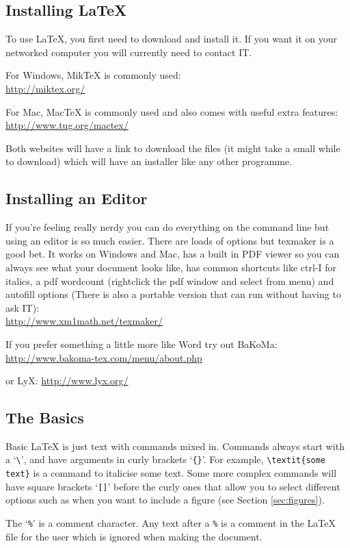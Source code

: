 \documentclass[11pt,a4paper,oneside]{article}
\begin{document}
\subsection{Installing \LaTeX}
To use \LaTeX, you first need to download and install it.  If you want it on your networked computer you will currently need to contact IT. 

For Windows, MikTeX is commonly used:\\
\url{http://miktex.org/}

For Mac,  MacTeX is commonly used and also comes with useful extra features:\\
\url{http://www.tug.org/mactex/}

Both websites will have a link to download the files (it might take a small while to download) which will have an installer like any other programme. 

\subsection{Installing an Editor}
If you're feeling really nerdy you can do everything on the command line but using an editor is so much easier.  There are loads of options but texmaker is a good bet.  It works on Windows and Mac, has a built in PDF viewer so you can always see what your document looks like, has common shortcuts like ctrl-I for italics, a pdf wordcount (rightclick the pdf window and select from menu) and autofill options (There is also a portable version that can run without having to ask IT):\\
\url{http://www.xm1math.net/texmaker/}

If you prefer something a little more like Word try out BaKoMa:
\url{http://www.bakoma-tex.com/menu/about.php}

or LyX:
\url{http://www.lyx.org/}

\subsection{The Basics}
Basic \LaTeX{} is just text with commands mixed in.  Commands always start with a `\verb!\!', and have arguments in curly brackets `\verb!{}!'. For example, \verb!\textit{some text}! is a command to italicise some text. Some more complex commands will have square brackets `\verb![]!' before the curly ones that allow you to select different options such as when you want to include a figure (see Section \ref{sec:figures}).

The `\verb!%!' is a comment character.  Any text after a \verb!%! is a comment in the \LaTeX{} file for the user which is ignored when making the document.
\end{document}
